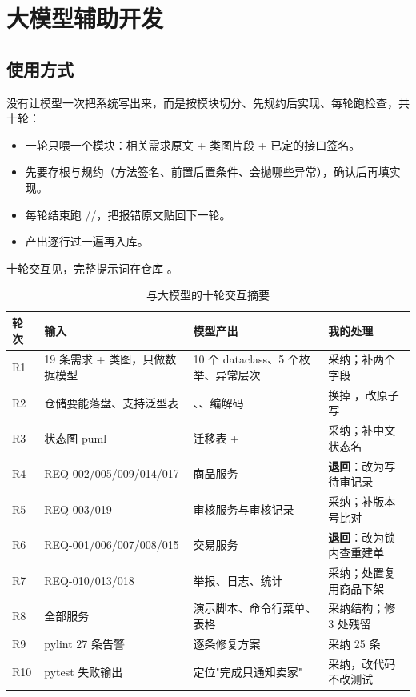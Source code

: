 \section{大模型辅助开发}

\subsection{使用方式}

没有让模型一次把系统写出来，而是按模块切分、先规约后实现、每轮跑检查，共十轮：

\begin{itemize}[leftmargin=1.6em,itemsep=2pt,topsep=3pt]
\item 一轮只喂一个模块：相关需求原文 + 类图片段 + 已定的接口签名。
\item 先要存根与规约（方法签名、前置后置条件、会抛哪些异常），确认后再填实现。
\item 每轮结束跑 //，把报错原文贴回下一轮。
\item 产出逐行过一遍再入库。
\end{itemize}

十轮交互见，完整提示词在仓库 。

\begin{table}[htbp]
\centering
\caption{与大模型的十轮交互摘要}\label{tab:rounds}
\renewcommand{\arraystretch}{1.16}
\begin{tabularx}{\textwidth}{@{}L{0.9cm}L{3.6cm}L{4.4cm}Y@{}}
\toprule
轮次 & 输入 & 模型产出 & 我的处理 \\
\midrule
R1 & 19 条需求 + 类图，只做数据模型 & 10 个 dataclass、5 个枚举、异常层次 & 采纳；补两个字段 \\
R2 & 仓储要能落盘、支持泛型表 & 、、编解码 & 换掉 ，改原子写 \\
R3 & 状态图 puml & 迁移表 +  & 采纳；补中文状态名 \\
R4 & REQ-002/005/009/014/017 & 商品服务 & \textbf{退回}：改为写待审记录 \\
R5 & REQ-003/019 & 审核服务与审核记录 & 采纳；补版本号比对 \\
R6 & REQ-001/006/007/008/015 & 交易服务 & \textbf{退回}：改为锁内查重建单 \\
R7 & REQ-010/013/018 & 举报、日志、统计 & 采纳；处置复用商品下架 \\
R8 & 全部服务 & 演示脚本、命令行菜单、表格 & 采纳结构；修 3 处残留 \\
R9 & pylint 27 条告警 & 逐条修复方案 & 采纳 25 条 \\
R10 & pytest 失败输出 & 定位"完成只通知卖家" & 采纳，改代码不改测试 \\
\bottomrule
\end{tabularx}
\end{table}

